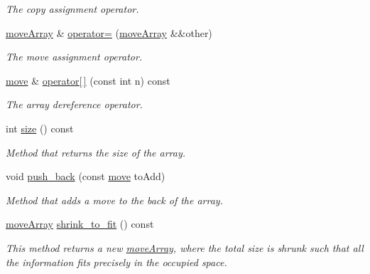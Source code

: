 \begin{DoxyCompactItemize}
\begin{DoxyCompactList}\small\item\em The copy assignment operator. \end{DoxyCompactList}\item 
\hyperlink{structmoveArray}{move\+Array} \& \hyperlink{structmoveArray_ac52807be18bc0ed75496b11cedacb95c}{operator=} (\hyperlink{structmoveArray}{move\+Array} \&\&other)\hypertarget{structmoveArray_ac52807be18bc0ed75496b11cedacb95c}{}\label{structmoveArray_ac52807be18bc0ed75496b11cedacb95c}

\begin{DoxyCompactList}\small\item\em The move assignment operator. \end{DoxyCompactList}\item 
\hyperlink{structmove}{move} \& \hyperlink{structmoveArray_aa3317dd23eb3dc6357ffc838cbe2d4a4}{operator\mbox{[}$\,$\mbox{]}} (const int n) const \hypertarget{structmoveArray_aa3317dd23eb3dc6357ffc838cbe2d4a4}{}\label{structmoveArray_aa3317dd23eb3dc6357ffc838cbe2d4a4}

\begin{DoxyCompactList}\small\item\em The array dereference operator. \end{DoxyCompactList}\item 
int \hyperlink{structmoveArray_a1d5b95916e6e90e23001f844969f146c}{size} () const \hypertarget{structmoveArray_a1d5b95916e6e90e23001f844969f146c}{}\label{structmoveArray_a1d5b95916e6e90e23001f844969f146c}

\begin{DoxyCompactList}\small\item\em Method that returns the size of the array. \end{DoxyCompactList}\item 
void \hyperlink{structmoveArray_affee3c505faa6dc63cede89334cbfc7d}{push\+\_\+back} (const \hyperlink{structmove}{move} to\+Add)\hypertarget{structmoveArray_affee3c505faa6dc63cede89334cbfc7d}{}\label{structmoveArray_affee3c505faa6dc63cede89334cbfc7d}

\begin{DoxyCompactList}\small\item\em Method that adds a move to the back of the array. \end{DoxyCompactList}\item 
\hyperlink{structmoveArray}{move\+Array} \hyperlink{structmoveArray_a8cbadab6d32b78d1bb4f5f68259be549}{shrink\+\_\+to\+\_\+fit} () const \hypertarget{structmoveArray_a8cbadab6d32b78d1bb4f5f68259be549}{}\label{structmoveArray_a8cbadab6d32b78d1bb4f5f68259be549}

\begin{DoxyCompactList}\small\item\em This method returns a new \hyperlink{structmoveArray}{move\+Array}, where the total size is shrunk such that all the information fits precisely in the occupied space. \end{DoxyCompactList}\end{DoxyCompactItemize}
